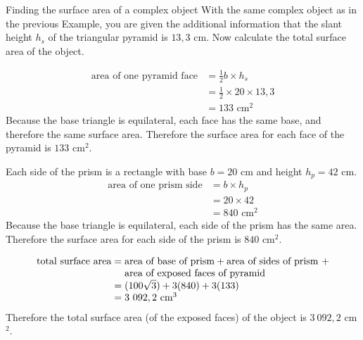 \begin{wex}{Finding the surface area of a complex object}
{With the same complex object as in the previous Example, you are given
  the additional information that the slant height $h_s$ of the
  triangular pyramid is $13,3$ cm. Now calculate the total surface area
  of the object.}
{
\begin{align*}
  \mbox{area of one pyramid face}
  &= \frac{1}{2}b \times h_s \\
  &= \frac{1}{2} \times 20 \times 13,3 \\
  &= 133\mbox{ cm}^2
\end{align*}
Because the base triangle is equilateral, each face has the same base,
and therefore the same surface area. Therefore the surface area for
each face of the pyramid is $133$ cm$^{2}$.

Each side of the prism is a rectangle with base $b = 20$ cm and height
$h_p = 42$ cm.
\begin{align*}
  \mbox{area of one prism side}
  &= b \times h_p \\
  &= 20 \times 42 \\
  &= 840\mbox{ cm}^2
\end{align*}
Because the base triangle is equilateral, each side of the prism has
the same area. Therefore the surface area for each side of the prism
is $840$ cm$^{2}$.

\begin{equation*}
  \begin{array}{r@{\;}c@{\;}l}
    \mbox{total surface area} &=& \mbox{area of base of prism} + \mbox{area of sides of prism } + \\
                              & & \mbox{area of exposed faces of pyramid} \\
    &=& (100 \sqrt{3}) + 3(840) + 3(133) \\
    &=& 3~092,2\mbox{ cm}^3
  \end{array}
\end{equation*}
Therefore the total surface area (of the exposed faces) of the object is $3~092,2$ cm$^{2}$.
}
\end{wex}


